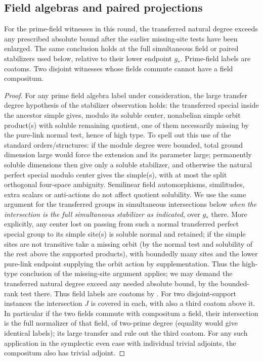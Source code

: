 \subsection{Field algebras and paired projections}
\begin{lemma}
\label{fb:large-transfer}
For the prime-field witnesses in this round, the transferred natural degree
exceeds any prescribed absolute bound after the earlier missing-site tests
have been enlarged.  The same conclusion holds at the full simultaneous
field or paired stabilizers used below, relative to their lower endpoint
\(g_*\).  Prime-field labels are coatoms.  Two disjoint witnesses whose
fields commute cannot have a field compositum.
\end{lemma}
\begin{proof}

For any prime field algebra label under consideration, the large transfer degree hypothesis of the stabilizer observation holds: the transferred special inside the ancestor simple gives, modulo its soluble center, nonabelian simple orbit product(s) with soluble remaining quotient, one of them necessarily missing by the pure-link normal test, hence of high type. To spell out this use of the standard orders/structures: if the module degree were bounded, total ground dimension large would force the extension and its parameter large; permanently soluble dimensions then give only a soluble stabilizer, and otherwise the natural perfect special modulo center gives the simple(s), with at most the split orthogonal four-space ambiguity. Semilinear field automorphisms, similitudes, extra scalars or anti-actions do not affect quotient solubility. We use the same argument for the transferred groups in simultaneous intersections below \emph{when the intersection is the full simultaneous stabilizer as indicated}, over \(g_*\) there. More explicitly, any center lost on passing from such a normal transferred perfect special group to its simple site(s) is soluble normal and retained; if the simple sites are not transitive take a missing orbit (by the normal test and solubility of the rest above the supported products), with boundedly many sites and the lower pure-link endpoint supplying the orbit action by supplementation. Thus the high-type conclusion of the missing-site argument applies; we may demand the transferred natural degree exceed any needed absolute bound, by the bounded-rank test there. Thus field labels are coatoms by . For two disjoint-support instances the intersection \(J\) is covered in each, with also a third coatom above it. In particular if the two fields commute with compositum a field, their intersection is the full normalizer of that field, of two-prime degree (equality would give identical labels); its large transfer and  rule out the third coatom. For any such application in the symplectic even case with individual trivial adjoints, the compositum also has trivial adjoint.

\end{proof}

